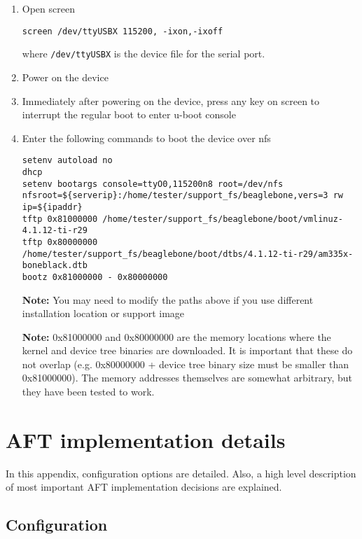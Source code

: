 \documentclass[a4paper,11pt]{article}
\newcommand{\note}{\textbf{Note: }}
\newcommand{\cmd}[1]{\texttt{#1}}
\begin{document}
\begin{enumerate}
\item Open screen

\begin{lstlisting}
screen /dev/ttyUSBX 115200, -ixon,-ixoff
\end{lstlisting}
where \cmd{/dev/ttyUSBX} is the device file for the serial port.

\item Power on the device

\item Immediately after powering on the device, press any key on screen to interrupt the regular boot to enter u-boot console

\item Enter the following commands to boot the device over nfs

\begin{lstlisting}
setenv autoload no
dhcp
setenv bootargs console=ttyO0,115200n8 root=/dev/nfs nfsroot=${serverip}:/home/tester/support_fs/beaglebone,vers=3 rw ip=${ipaddr}
tftp 0x81000000 /home/tester/support_fs/beaglebone/boot/vmlinuz-4.1.12-ti-r29
tftp 0x80000000 /home/tester/support_fs/beaglebone/boot/dtbs/4.1.12-ti-r29/am335x-boneblack.dtb
bootz 0x81000000 - 0x80000000
\end{lstlisting}

\note You may need to modify the paths above if you use different installation location or support image

\note 0x81000000 and 0x80000000 are the memory locations where the kernel and device tree binaries are downloaded. It is important that these do not overlap (e.g. 0x80000000 + device tree binary size must be smaller than 0x81000000). The memory addresses themselves are somewhat arbitrary, but they have been tested to work.

\end{enumerate}


\newpage
\appendix
\section{AFT implementation details}
\label{app:aft}

In this appendix, configuration options are detailed. Also, a high level description of most important AFT implementation decisions are explained. 

\subsection{Configuration}
\end{document}
